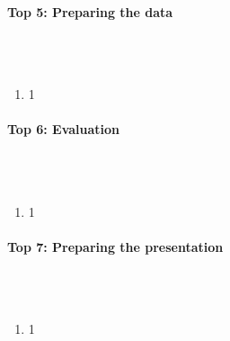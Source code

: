 \documentclass{scrartcl}
\begin{document}
\paragraph{Top 5: Preparing the data}
\hfill \\ \hfill \\
\begin {enumerate}
\item 1
\end {enumerate}

\paragraph{Top 6: Evaluation}
\hfill \\ \hfill \\
\begin {enumerate}
\item 1
\end {enumerate}

\paragraph{Top 7: Preparing the presentation}
\hfill \\ \hfill \\
\begin {enumerate}
\item 1
\end {enumerate}
\end{document}
